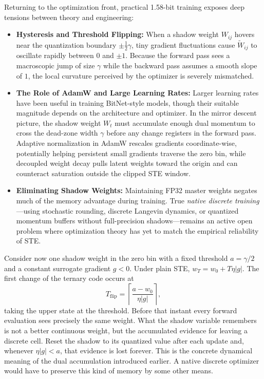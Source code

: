 Returning to the optimization front, practical 1.58-bit training exposes deep tensions between theory and engineering:
\begin{itemize}
    \item \textbf{Hysteresis and Threshold Flipping:} When a shadow weight $W_{ij}$ hovers near the quantization boundary $\pm \tfrac{1}{2}\gamma$, tiny gradient fluctuations cause $\widetilde{W}_{ij}$ to oscillate rapidly between $0$ and $\pm 1$. Because the forward pass sees a macroscopic jump of size $\gamma$ while the backward pass assumes a smooth slope of $1$, the local curvature perceived by the optimizer is severely mismatched.
    \item \textbf{The Role of AdamW and Large Learning Rates:} Larger learning rates have been useful in training BitNet-style models, though their suitable magnitude depends on the architecture and optimizer. In the mirror descent picture, the shadow weight $W_t$ must accumulate enough dual momentum to cross the dead-zone width $\gamma$ before any change registers in the forward pass. Adaptive normalization in AdamW rescales gradients coordinate-wise, potentially helping persistent small gradients traverse the zero bin, while decoupled weight decay pulls latent weights toward the origin and can counteract saturation outside the clipped STE window.
    \item \textbf{Eliminating Shadow Weights:} Maintaining FP32 master weights negates much of the memory advantage during training. True \emph{native discrete training}—using stochastic rounding, discrete Langevin dynamics, or quantized momentum buffers without full-precision shadows—remains an active open problem where optimization theory has yet to match the empirical reliability of STE.
\end{itemize}

Consider now one shadow weight in the zero bin with a fixed threshold $a=\gamma/2$ and a constant surrogate gradient $g<0$. Under plain STE, $w_T=w_0+T\eta|g|$. The first change of the ternary code occurs at
\[
       T_{\mathrm{flip}}
           =\left\lceil\frac{a-w_0}{\eta|g|}\right\rceil,
\]
taking the upper state at the threshold. Before that instant every forward evaluation sees precisely the same weight. What the shadow variable remembers is not a better continuous weight, but the accumulated evidence for leaving a discrete cell. Reset the shadow to its quantized value after each update and, whenever $\eta|g|<a$, that evidence is lost forever. This is the concrete dynamical meaning of the dual accumulation introduced earlier. A native discrete optimizer would have to preserve this kind of memory by some other means.

